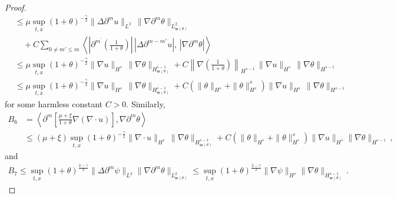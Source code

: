 \documentclass[reqno,11pt]{amsart}
\numberwithin{equation}{section}
\def\w{\mathfrak{w}}
\begin{document}
\begin{proof}
\begin{equation}
\begin{aligned}
&\leq \mu \sup_{t,x} (1 + \theta)^{- \frac{\gamma}{2}} \| \Delta \partial^m u \|_{L^2} \, \| \nabla \partial^m \theta\|_{L^2_{\w (\theta)}} \\
& \quad + C \sum_{0 \neq m' \leq m} \left\langle \left| \partial^{m^\prime} \left( \frac{1}{1+\theta} \right) \right| \, \left| \Delta \partial^{m-m'} u \right| , \, | \nabla \partial^m \theta| \right\rangle \\
&\leq \mu \sup_{t,x} (1 + \theta)^{- \frac{\gamma}{2}} \| \nabla u \|_{H^s} \, \| \nabla \theta \|_{H^{s-1}_{\w (\theta)}} + C \left\| \nabla \left( \frac{1}{1+\theta} \right) \right\|_{H^{s-1}} \, \| \nabla u \|_{H^{s}} \, \| \nabla \theta \|_{H^{s-1}} \\
&\leq \mu \sup_{t,x} (1 + \theta)^{- \frac{\gamma}{2}} \| \nabla u \|_{H^s} \, \| \nabla \theta \|_{H^{s-1}_{\w (\theta)}} + C \left( \| \theta \|_{H^s} + \| \theta \|^s_{H^s} \right) \| \nabla u \|_{H^s} \, \| \nabla \theta \|_{H^{s-1}}
\end{aligned}
\end{equation}
for some harmless constant $C>0$. Similarly, 
\begin{equation}\label{theta-eq7}
\begin{aligned}
B_6 & =\left\langle \partial^m \left[ \frac{\mu + \xi}{1+\theta} \nabla (\nabla \cdot u) \right], \nabla \partial^m \theta \right\rangle \\&
\leq (\mu + \xi ) \sup_{t,x} (1 + \theta)^{- \frac{\gamma}{2}} \| \nabla \cdot u \|_{H^s} \, \| \nabla \theta \|_{H^{s-1}_{\w (\theta)}} + C \left( \|\theta\|_{H^s} + \|\theta\|_{H^s}^s \right) \|\nabla u\|_{H^s} \|\nabla \theta\|_{H^{s-1}} \,,
\end{aligned}
\end{equation}
and
\begin{equation}\label{theta-eq8}
\begin{aligned}
B_7 \leq \sup_{t,x} (1 + \theta)^\frac{2 - \gamma}{2} \|\Delta \partial^m \psi\|_{L^2} \|\nabla \partial^m \theta\|_{L^2_{\w (\theta)}} \leq \sup_{t,x} (1 + \theta)^\frac{2 - \gamma}{2} \|\nabla \psi\|_{H^s} \|\nabla \theta\|_{H^{s-1}_{\w (\theta)}} \,.
\end{aligned}
\end{equation}


\end{proof}
\end{document}
